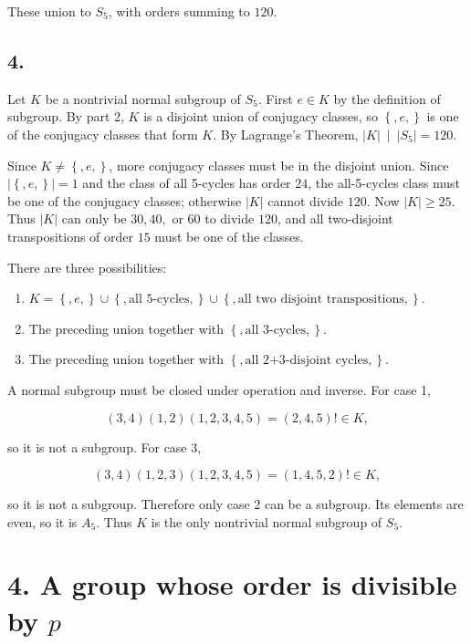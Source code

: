 These union to \(S_{5}\), with orders summing to \(120\).

\subsection{4.}

Let \(K\) be a nontrivial normal subgroup of \(S_{5}\). First \(e \in K\) by the definition of subgroup. By part 2, \(K\) is a disjoint union of conjugacy classes, so \(\left\{ {,e,} \right\}\) is one of the conjugacy classes that form \(K\). By Lagrange's Theorem, \(\left. |K|\  \middle| \ \left| S_{5} \right| = 120 \right.\).

Since \(K \neq \left\{ {,e,} \right\}\), more conjugacy classes must be in the disjoint union. Since \(\left| \left\{ {,e,} \right\} \right| = 1\) and the class of all 5-cycles has order \(24\), the all-5-cycles class must be one of the conjugacy classes; otherwise \(|K|\) cannot divide \(120\). Now \(|K| \geq 25\). Thus \(|K|\) can only be \(30,40,\) or \(60\) to divide \(120\), and all two-disjoint transpositions of order \(15\) must be one of the classes.

There are three possibilities:

\begin{enumerate}
\tightlist
\item
  \(K = \left\{ {,e,} \right\} \cup \left\{ {,\text{all 5-cycles},} \right\} \cup \left\{ {,\text{all two disjoint transpositions},} \right\}\).
\item
  The preceding union together with \(\left\{ {,\text{all 3-cycles},} \right\}\).
\item
  The preceding union together with \(\left\{ {,\text{all 2+3-disjoint cycles},} \right\}\).
\end{enumerate}

A normal subgroup must be closed under operation and inverse. For case 1,

\[\left( {3,4} \right)\left( {1,2} \right)\left( {1,2,3,4,5} \right) = \left( {2,4,5} \right)! \in K,\]

so it is not a subgroup. For case 3,

\[\left( {3,4} \right)\left( {1,2,3} \right)\left( {1,2,3,4,5} \right) = \left( {1,4,5,2} \right)! \in K,\]

so it is not a subgroup. Therefore only case 2 can be a subgroup. Its elements are even, so it is \(A_{5}\). Thus \(K\) is the only nontrivial normal subgroup of \(S_{5}\).

\section{\texorpdfstring{4. A group whose order is divisible by \(p\)}{4. A group whose order is divisible by p}}

